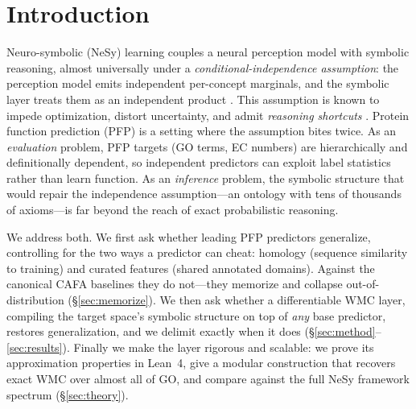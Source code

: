 \documentclass[11pt]{article}
\begin{document}
\section{Introduction}
Neuro-symbolic (NeSy) learning couples a neural perception model with symbolic reasoning, almost
universally under a \emph{conditional-independence assumption}: the perception model emits
independent per-concept marginals, and the symbolic layer treats them as an independent product
\citep{manhaeve2018deepproblog,xu2018semanticloss,ahmed2022spl}. This assumption is known to
impede optimization, distort uncertainty, and admit \emph{reasoning shortcuts}
\citep{vankrieken2024independence,marconato2023reasoningshortcuts}. Protein function prediction
(PFP) is a setting where the assumption bites twice. As an \emph{evaluation} problem, PFP targets
(GO terms, EC numbers) are hierarchically and definitionally dependent, so independent predictors
can exploit label statistics rather than learn function. As an \emph{inference} problem, the
symbolic structure that would repair the independence assumption---an ontology with tens of
thousands of axioms---is far beyond the reach of exact probabilistic reasoning.

We address both. We first ask whether leading PFP predictors generalize, controlling for the two
ways a predictor can cheat: homology (sequence similarity to training) and curated features
(shared annotated domains). Against the canonical CAFA baselines they do not---they memorize and
collapse out-of-distribution (\S\ref{sec:memorize}). We then ask whether a differentiable WMC
layer, compiling the target space's symbolic structure on top of \emph{any} base predictor,
restores generalization, and we delimit exactly when it does (\S\ref{sec:method}--\ref{sec:results}).
Finally we make the layer rigorous and scalable: we prove its approximation properties in Lean~4,
give a modular construction that recovers exact WMC over almost all of GO, and compare against the
full NeSy framework spectrum (\S\ref{sec:theory}).
\end{document}
